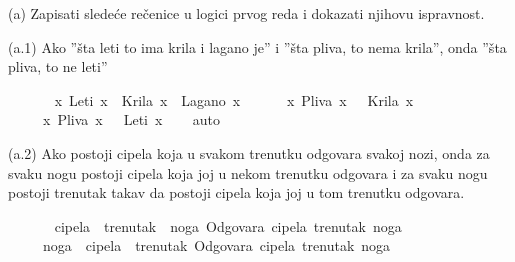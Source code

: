 %
\begin{isabellebody}%
%
%
\isadelimtheory
%
\endisadelimtheory
%
\isatagtheory
%
\endisatagtheory
{\isafoldtheory}%
%
\isadelimtheory
%
\endisadelimtheory
%
\begin{exercise}[subtitle=Zapisivanje logičkih formula (nastavak)]
%
\begin{isamarkuptext}%
(a) Zapisati sledeće rečenice u logici prvog reda i dokazati njihovu ispravnost.%
\end{isamarkuptext}\isamarkuptrue%
%
\begin{isamarkuptext}%
(a.1) Ako ”šta leti to ima krila i lagano je” 
            i ”šta pliva, to nema krila”, 
            onda ”šta pliva, to ne leti”%
\end{isamarkuptext}\isamarkuptrue%
\isamarkupfalse%
\ {\isachardoublequoteopen}\isanewline
\ \ \ \ {\isacharparenleft}{\kern0pt}{\isasymforall}\ x{\isachardot}{\kern0pt}\ Leti\ x\ {\isasymlongrightarrow}\ Krila\ x\ {\isasymand}\ Lagano\ x{\isacharparenright}{\kern0pt}\ {\isasymand}\isanewline
\ \ \ \ {\isacharparenleft}{\kern0pt}{\isasymforall}\ x{\isachardot}{\kern0pt}\ Pliva\ x\ {\isasymlongrightarrow}\ {\isasymnot}\ Krila\ x{\isacharparenright}{\kern0pt}\ {\isasymlongrightarrow}\isanewline
\ \ \ \ {\isacharparenleft}{\kern0pt}{\isasymforall}\ x{\isachardot}{\kern0pt}\ Pliva\ x\ {\isasymlongrightarrow}\ {\isasymnot}\ Leti\ x{\isacharparenright}{\kern0pt}{\isachardoublequoteclose}\isanewline
%
\isadelimproof
\ \ %
\endisadelimproof
%
\isatagproof
{}\isamarkupfalse%
\ auto%
\endisatagproof
{\isafoldproof}%
%
\isadelimproof
%
\endisadelimproof
%
\begin{isamarkuptext}%
(a.2) Ako postoji cipela koja u svakom trenutku odgovara svakoj nozi, 
            onda za svaku nogu postoji cipela koja joj u nekom trenutku odgovara 
            i za svaku nogu postoji trenutak takav da postoji cipela koja joj u tom 
            trenutku odgovara.%
\end{isamarkuptext}\isamarkuptrue%
\isamarkupfalse%
\ {\isachardoublequoteopen}\isanewline
\ \ \ \ {\isacharparenleft}{\kern0pt}{\isasymexists}\ cipela{\isachardot}{\kern0pt}\ {\isasymforall}\ trenutak{\isachardot}{\kern0pt}\ {\isasymforall}\ noga{\isachardot}{\kern0pt}\ Odgovara\ cipela\ trenutak\ noga{\isacharparenright}{\kern0pt}\ {\isasymlongrightarrow}\isanewline
\ \ \ \ {\isacharparenleft}{\kern0pt}{\isasymforall}\ noga{\isachardot}{\kern0pt}\ {\isasymexists}\ cipela{\isachardot}{\kern0pt}\ {\isasymexists}\ trenutak{\isachardot}{\kern0pt}\ Odgovara\ cipela\ trenutak\ noga{\isacharparenright}{\kern0pt}\ {\isasymand}\isanewline

\end{exercise}
\end{isabellebody}
